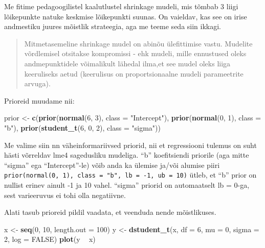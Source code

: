 \documentclass[]{book}
\newenvironment{Shaded}{\begin{snugshade}}{\end{snugshade}}
\newcommand{\KeywordTok}[1]{\textcolor[rgb]{0.13,0.29,0.53}{\textbf{#1}}}
\newcommand{\DataTypeTok}[1]{\textcolor[rgb]{0.13,0.29,0.53}{#1}}
\newcommand{\DecValTok}[1]{\textcolor[rgb]{0.00,0.00,0.81}{#1}}
\newcommand{\StringTok}[1]{\textcolor[rgb]{0.31,0.60,0.02}{#1}}
\newcommand{\OtherTok}[1]{\textcolor[rgb]{0.56,0.35,0.01}{#1}}
\newcommand{\OperatorTok}[1]{\textcolor[rgb]{0.81,0.36,0.00}{\textbf{#1}}}
\newcommand{\NormalTok}[1]{#1}
\begin{document}
Me fitime pedagoogilistel kaalutlustel shrinkage mudeli, mis tõmbab 3
liigi lõikepunkte natuke keskmise lõikepunkti suunas. On vaieldav, kas
see on irise andmestiku juures mõistlik strateegia, aga me teeme seda
siin ikkagi.

\begin{quote}
Mitmetasemeline shrinkage mudel on abinõu ülefittimise vastu. Mudelite
võrdlemisel otsitakse kompromissi - ehk mudeli, mille ennustused oleks
andmepunktidele võimalikult lähedal ilma,et see mudel oleks liiga
keeruliseks aetud (keerulisus on proportsionaalne mudeli parameetrite
arvuga).
\end{quote}

Prioreid muudame nii:

\begin{Shaded}
\begin{Highlighting}[]
\NormalTok{prior <-}\StringTok{ }\KeywordTok{c}\NormalTok{(}\KeywordTok{prior}\NormalTok{(}\KeywordTok{normal}\NormalTok{(}\DecValTok{6}\NormalTok{, }\DecValTok{3}\NormalTok{), }\DataTypeTok{class =} \StringTok{"Intercept"}\NormalTok{),}
           \KeywordTok{prior}\NormalTok{(}\KeywordTok{normal}\NormalTok{(}\DecValTok{0}\NormalTok{, }\DecValTok{1}\NormalTok{), }\DataTypeTok{class =} \StringTok{"b"}\NormalTok{),}
           \KeywordTok{prior}\NormalTok{(}\KeywordTok{student_t}\NormalTok{(}\DecValTok{6}\NormalTok{, }\DecValTok{0}\NormalTok{, }\DecValTok{2}\NormalTok{), }\DataTypeTok{class =} \StringTok{"sigma"}\NormalTok{))}
\end{Highlighting}
\end{Shaded}

Me valime siin nn väheinformariivsed priorid, nii et regressiooni
tulemus on suht hästi võrreldav lme4 sagedusliku mudeliga. ``b''
koefitsiendi priorile (aga mitte ``sigma'' ega ``Intercept''-le) võib
anda ka ülemise ja/või alumise piiri
\texttt{prior(normal(0,\ 1),\ class\ =\ "b",\ lb\ =\ -1,\ ub\ =\ 10)}
ütleb, et ``b'' prior on nullist erinev ainult -1 ja 10 vahel. ``sigma''
priorid on automaatselt lb = 0-ga, sest varieeruvus ei tohi olla
negatiivne.

Alati tasub prioreid pildil vaadata, et veenduda nende mõistlikuses.

\begin{Shaded}
\begin{Highlighting}[]
\NormalTok{x <-}\StringTok{ }\KeywordTok{seq}\NormalTok{(}\DecValTok{0}\NormalTok{, }\DecValTok{10}\NormalTok{, }\DataTypeTok{length.out =} \DecValTok{100}\NormalTok{)}
\NormalTok{y <-}\StringTok{ }\KeywordTok{dstudent_t}\NormalTok{(x, }\DataTypeTok{df =} \DecValTok{6}\NormalTok{, }\DataTypeTok{mu =} \DecValTok{0}\NormalTok{, }\DataTypeTok{sigma =} \DecValTok{2}\NormalTok{, }\DataTypeTok{log =} \OtherTok{FALSE}\NormalTok{)}
\KeywordTok{plot}\NormalTok{(y }\OperatorTok{~}\StringTok{ }\NormalTok{x)}
\end{Highlighting}
\end{Shaded}
\end{document}
